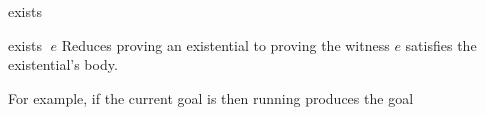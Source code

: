 \begin{tactic}[exists $\;e$]{exists}
  \begin{tsyntax}[empty]{exists $\;e$}
    Reduces proving an existential to proving the witness $e$ satisfies
    the existential's body.

    For example, if the current goal is
     then
    running 
    produces the goal
  \end{tsyntax}
\end{tactic}
